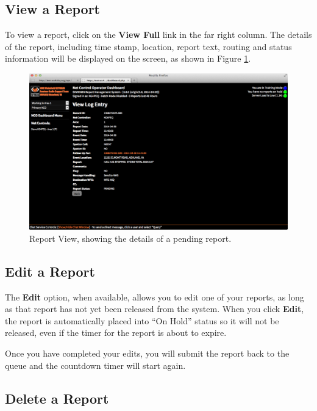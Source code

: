 \documentclass[pdflatex,letterpaper,twoside,12pt]{book}
\begin{document}
\subsection{View a Report}

To view a report, click on the \textbf{View Full} link in the far right column.  The details of the report, including time stamp, location, report text, routing and status information will be displayed on the screen, as shown in Figure \ref{fig:dash-report-view}.

\begin{figure}[h]
  \centering
  \includegraphics[width=\textwidth,keepaspectratio=true]{img/dash-report-view}
  \caption{Report View, showing the details of a pending report.\label{fig:dash-report-view}}
\end{figure}

\subsection{Edit a Report}

The \textbf{Edit} option, when available, allows you to edit one of your reports, as long as that report has not yet been released from the system.  When you click \textbf{Edit}, the report is automatically placed into ``On Hold'' status so it will not be released, even if the timer for the report is about to expire.

Once you have completed your edits, you will submit the report back to the queue and the countdown timer will start again.

\subsection{Delete a Report}
\end{document}
